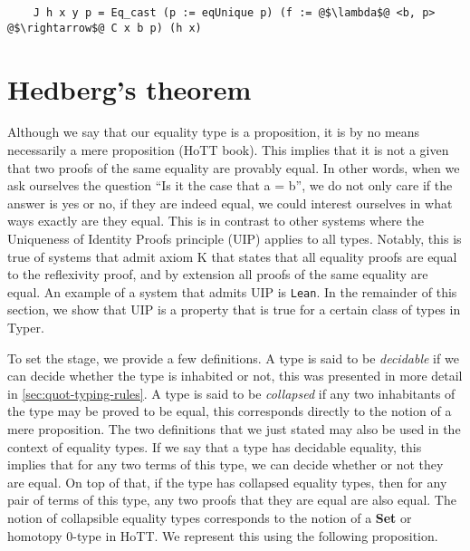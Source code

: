 \documentclass[12pt,twoside,maitrise]{dms}
\theoremstyle{definition}
\numberwithin{equation}{section}
\numberwithin{table}{chapter}
\numberwithin{figure}{chapter}
\newcommand\id[1] {\texttt{#1}}
\begin{document}
\begin{verbatim}
    J h x y p = Eq_cast (p := eqUnique p) (f := @$\lambda$@ <b, p> @$\rightarrow$@ C x b p) (h x)
\end{verbatim}

\section{Hedberg's theorem}\label{subsec:hedberg}

Although we say that our equality type is a proposition, it is by no means
necessarily a mere proposition (HoTT book\cite[Chap~3.3]{HoTTbook}). This
implies that it is not a given that two proofs of the same equality are
provably equal\cite{hofmann1998groupoid}. In other words, when we ask ourselves
the question ``Is it the case that a = b'', we do not only care if the answer
is yes or no, if they are indeed equal, we could interest ourselves in what
ways exactly are they equal. This is in contrast to other systems where the
Uniqueness of Identity Proofs principle (UIP) applies to all types. Notably,
this is true of systems that admit axiom K\cite{streicher1993investigations}
that states that all equality proofs are equal to the reflexivity proof, and by
extension all proofs of the same equality are equal. An example of a system
that admits UIP is \id{Lean}. In the remainder of this section, we show that
UIP is a property that is true for a certain class of types in Typer.

To set the stage, we provide a few definitions. A type is said to be
\emph{decidable} if we can decide whether the type is inhabited or not, this was
presented in more detail in \autoref{sec:quot-typing-rules}. A type is said to
be \emph{collapsed} if any two inhabitants of the type may be proved to be
equal, this corresponds directly to the notion of a mere proposition. The two
definitions that we just stated may also be used in the context of equality
types. If we say that a type has decidable equality, this implies that for any
two terms of this type, we can decide whether or not they are equal. On top of
that, if the type has collapsed equality types, then for any pair of terms of
this type, any two proofs that they are equal are also equal. The notion of
collapsible equality types corresponds to the notion of a \textbf{Set} or
homotopy 0-type in HoTT\cite[Chap~3.1]{HoTTbook}. We represent this using the
following proposition.
\end{document}
